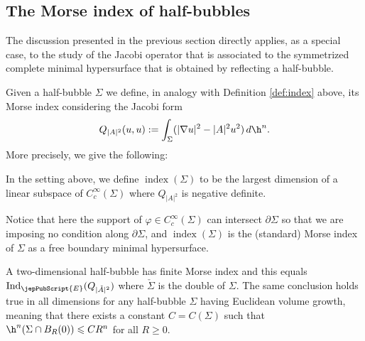         	\subsection{The Morse index of half-bubbles}\label{subs:morsehalf}
        	
        	The discussion presented in the previous section directly applies, as a special case, to the study of the Jacobi operator
        	that is associated to the symmetrized complete minimal hypersurface that is obtained by reflecting a half-bubble. 
        	
        	Given a half-bubble $\Sigma$ we define, in analogy with Definition \ref{def:index} above, its Morse index considering the Jacobi form
\[        	
Q_{|A|^2}(u,u):=\int_{\Sigma}(|\nabla u|^2-|A|^2u^2)\,d\h^n.
\] 
More precisely, we give the following:
        	
        	\begin{definition} In the setting above, we define
        		$\operatorname{index} (\Sigma)$ to be the largest dimension of a linear subspace of $C^{\infty}_c(\Sigma)$ where $Q_{|A|^2}$ is negative definite. 
        	\end{definition}	
        	\noindent Notice that here the support of $\varphi\in C^{\infty}_c(\Sigma)$ can intersect $\partial\Sigma$ so that we are imposing no condition along $\partial\Sigma$, and $\operatorname{index} (\Sigma)$ is the (standard) Morse index of $\Sigma$ as a free boundary minimal hypersurface.
        	
        	\begin{lem}\label{lem:II1}
        A two-dimensional half-bubble has finite Morse index and this equals $\operatorname{Ind}_{{\jepPubScript{E}}}(Q_{|\check{A}|^2})$ where $\check{\Sigma}$ is the double of $\Sigma$.
         The same conclusion holds true in all dimensions for any half-bubble $\Sigma$ having Euclidean volume growth, meaning that there exists a constant $C=C(\Sigma)$ such that $\h^n(\Sigma\cap B_R(0))\leqslant C R^n$ for all $R\geqslant 0$.
        	\end{lem}
        
